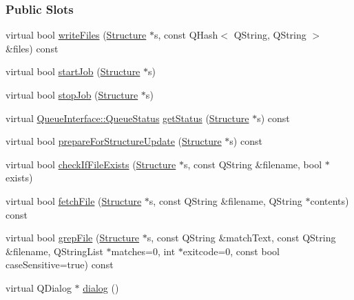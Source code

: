 \subsubsection*{Public Slots}
\begin{DoxyCompactItemize}
\item 
virtual bool \hyperlink{classGlobalSearch_1_1LocalQueueInterface_a68b017d4ee519055fc22dcb486ec2d45}{write\+Files} (\hyperlink{classGlobalSearch_1_1Structure}{Structure} $\ast$s, const Q\+Hash$<$ Q\+String, Q\+String $>$ \&files) const 
\item 
virtual bool \hyperlink{classGlobalSearch_1_1LocalQueueInterface_a5dae655b3316d9443ca5865a65b8d9f4}{start\+Job} (\hyperlink{classGlobalSearch_1_1Structure}{Structure} $\ast$s)
\item 
virtual bool \hyperlink{classGlobalSearch_1_1LocalQueueInterface_abd9adf1468347b0bdcc4f1f8c3676c1a}{stop\+Job} (\hyperlink{classGlobalSearch_1_1Structure}{Structure} $\ast$s)
\item 
virtual \hyperlink{classGlobalSearch_1_1QueueInterface_a08dcf06d1b99f6333472470490ca9a6d}{Queue\+Interface\+::\+Queue\+Status} \hyperlink{classGlobalSearch_1_1LocalQueueInterface_a1a6177bcf15d3df5dd744ca096cab86d}{get\+Status} (\hyperlink{classGlobalSearch_1_1Structure}{Structure} $\ast$s) const 
\item 
virtual bool \hyperlink{classGlobalSearch_1_1LocalQueueInterface_aec8ffad280b7e550d90529624c3b50fe}{prepare\+For\+Structure\+Update} (\hyperlink{classGlobalSearch_1_1Structure}{Structure} $\ast$s) const 
\item 
virtual bool \hyperlink{classGlobalSearch_1_1LocalQueueInterface_a7dfd8f70a313746a2651b405651d5c6c}{check\+If\+File\+Exists} (\hyperlink{classGlobalSearch_1_1Structure}{Structure} $\ast$s, const Q\+String \&filename, bool $\ast$exists)
\item 
virtual bool \hyperlink{classGlobalSearch_1_1LocalQueueInterface_ae0b1b95c62405c79b41604b7a4794a0d}{fetch\+File} (\hyperlink{classGlobalSearch_1_1Structure}{Structure} $\ast$s, const Q\+String \&filename, Q\+String $\ast$contents) const 
\item 
virtual bool \hyperlink{classGlobalSearch_1_1LocalQueueInterface_a948f5d6109f3fd3dff74799bb7573363}{grep\+File} (\hyperlink{classGlobalSearch_1_1Structure}{Structure} $\ast$s, const Q\+String \&match\+Text, const Q\+String \&filename, Q\+String\+List $\ast$matches=0, int $\ast$exitcode=0, const bool case\+Sensitive=true) const 
\item 
virtual Q\+Dialog $\ast$ \hyperlink{group__dialog_ga4bd87bf2050209a72d1a35c824e515da}{dialog} ()
\end{DoxyCompactItemize}
